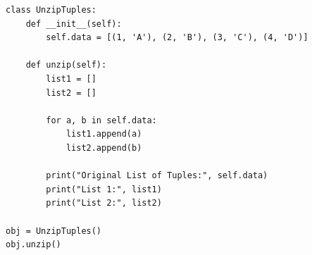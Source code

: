 \begin{verbatim}
class UnzipTuples:
    def __init__(self):
        self.data = [(1, 'A'), (2, 'B'), (3, 'C'), (4, 'D')]

    def unzip(self):
        list1 = []
        list2 = []

        for a, b in self.data:
            list1.append(a)
            list2.append(b)

        print("Original List of Tuples:", self.data)
        print("List 1:", list1)
        print("List 2:", list2)

obj = UnzipTuples()
obj.unzip()
\end{verbatim}